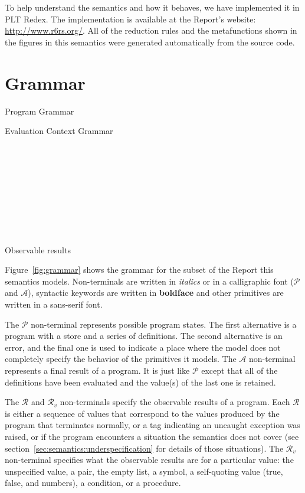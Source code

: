 To help understand the semantics and how it behaves, we have
implemented it in PLT Redex. The implementation is available at the
Report's website: \url{http://www.r6rs.org/}. All of the reduction
rules and the metafunctions shown in the figures in this semantics
were generated automatically from the source code.



\section{Grammar}\label{sec:semantics:grammar}

\beginfig

\caption{Program Grammar}\label{fig:grammar}
\endfig

\beginfig

\caption{Evaluation Context Grammar}\label{fig:ec-grammar}
\endfig

\beginfig
\begin{center}
\parbox{3.6in}{

~

~

~

~

~
}
\parbox{2.4in}{}
\end{center}
\caption{Observable results}\label{fig:observable}
\endfig


Figure~\ref{fig:grammar} shows the grammar for the subset of the
Report this semantics models. Non-terminals are written in
\textit{italics} or in a calligraphic font ($\mathcal{P}$ and
$\mathcal{A}$), syntactic keywords are written in \textbf{boldface} and
other primitives are written in a \textsf{sans-serif} font.

The $\mathcal{P}$ non-terminal represents possible program states. The
first alternative is a program with a store and a series of
definitions. The second alternative is an error, and the final one is
used to indicate a place where the model does not completely specify
the behavior of the primitives it models. The $\mathcal{A}$ non-terminal
represents a final result of a program. It is just like $\mathcal{P}$
except that all of the definitions have been evaluated and the
value(s) of the last one is retained.

The $\mathcal{R}$ and $\mathcal{R}_v$ non-terminals specify the observable results of a program. Each $\mathcal{R}$ is either a sequence of values that correspond to the values produced by the program that terminates normally, or a tag indicating an uncaught exception was raised, or  if the program encounters a situation the semantics does not cover (see section~\ref{sec:semantics:underspecification} for details of those situations). The $\mathcal{R}_v$ non-terminal specifies what the observable results are for a particular value: the unspecified value, a pair, the empty list, a symbol, a self-quoting value (true, false, and numbers), a condition, or a procedure.


